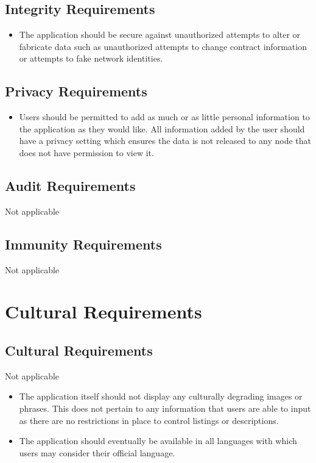 \documentclass{article}
\begin{document}
\subsection{Integrity Requirements}
\begin{itemize}
	\item 
	The application should be secure against unauthorized attempts to alter or fabricate data such as unauthorized attempts to change contract information or attempts to fake network identities.   	
\end{itemize}

\subsection{Privacy Requirements}
\begin{itemize}
	\item 
	Users should be permitted to add as much or as little personal information to the application as they would like. All information added by the user should have a privacy setting which ensures the data is not released to any node that does not have permission to view it.   	
\end{itemize}

\subsection{Audit Requirements}
Not applicable

\subsection{Immunity Requirements}
Not applicable

\section{Cultural Requirements}
\subsection{Cultural Requirements}
Not applicable

\begin{itemize}
\item
The application itself should not display any culturally degrading images or phrases. This does not pertain to any information that users are able to input as there are no restrictions in place to control listings or descriptions. 

\item
The application should eventually be available in all languages with which users may consider their official language.
\end{itemize}
\end{document}
